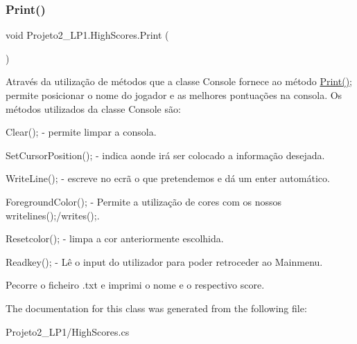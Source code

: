 \subsubsection{\texorpdfstring{Print()}{Print()}}
{\footnotesize\ttfamily void Projeto2\+\_\+\+L\+P1.\+High\+Scores.\+Print (\begin{DoxyParamCaption}{ }\end{DoxyParamCaption})\hspace{0.3cm}{\ttfamily [inline]}}



Através da utilização de métodos que a classe Console fornece ao método \mbox{\hyperlink{class_projeto2___l_p1_1_1_high_scores_af4ca1660307f8f8154bc44e1dfe9ff16}{Print()}}; permite posicionar o nome do jogador e as melhores pontuações na consola. Os métodos utilizados da classe Console são\+: 


\begin{DoxyItemize}
\item Clear(); -\/ permite limpar a consola.
\item Set\+Cursor\+Position(); -\/ indica aonde irá ser colocado a informação desejada.
\item Write\+Line(); -\/ escreve no ecrã o que pretendemos e dá um enter automático.
\item Foreground\+Color(); -\/ Permite a utilização de cores com os nossos writelines();/writes();.
\item Resetcolor(); -\/ limpa a cor anteriormente escolhida.
\item Readkey(); -\/ Lê o input do utilizador para poder retroceder ao Mainmenu. 
\end{DoxyItemize}Pecorre o ficheiro .txt e imprimi o nome e o respectivo score. 

The documentation for this class was generated from the following file\+:\begin{DoxyCompactItemize}
\item 
Projeto2\+\_\+\+L\+P1/High\+Scores.\+cs\end{DoxyCompactItemize}
